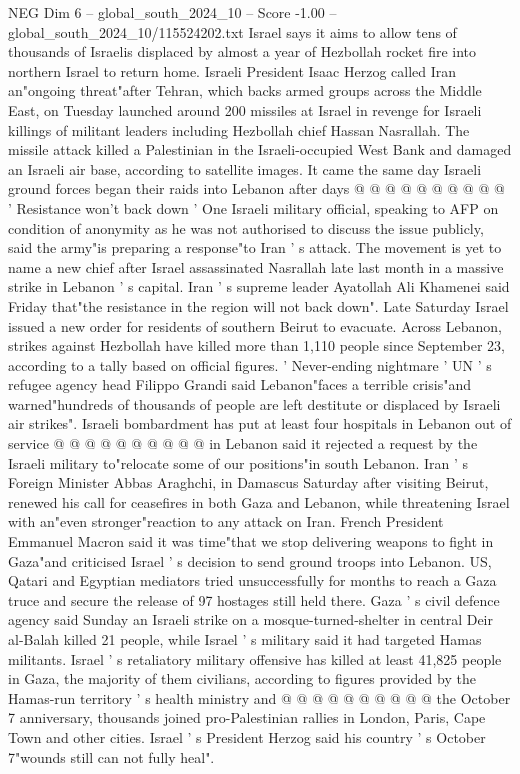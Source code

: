 \begin{textsample}{NEG Dim 6 – global\_south\_2024\_10 – Score -1.00 – global\_south\_2024\_10/115524202.txt}
Israel says it aims to allow tens of thousands of Israelis displaced by almost a year of Hezbollah rocket fire into northern Israel to return home.
Israeli President Isaac Herzog called Iran an"ongoing threat"after Tehran, which backs armed groups across the Middle East, on Tuesday launched around 200 missiles at Israel in revenge for Israeli killings of militant leaders including Hezbollah chief Hassan Nasrallah.
The missile attack killed a Palestinian in the Israeli-occupied West Bank and damaged an Israeli air base, according to satellite images.
It came the same day Israeli ground forces began their raids into Lebanon after days @ @ @ @ @ @ @ @ @ @ ' Resistance won't back down ' One Israeli military official, speaking to AFP on condition of anonymity as he was not authorised to discuss the issue publicly, said the army"is preparing a response"to Iran ' s attack.
The movement is yet to name a new chief after Israel assassinated Nasrallah late last month in a massive strike in Lebanon ' s capital.
Iran ' s supreme leader Ayatollah Ali Khamenei said Friday that"the resistance in the region will not back down".
Late Saturday Israel issued a new order for residents of southern Beirut to evacuate.
Across Lebanon, strikes against Hezbollah have killed more than 1,110 people since September 23, according to a tally based on official figures. ' Never-ending nightmare ' UN ' s refugee agency head Filippo Grandi said Lebanon"faces a terrible crisis"and warned"hundreds of thousands of people are left destitute or displaced by Israeli air strikes".
Israeli bombardment has put at least four hospitals in Lebanon out of service @ @ @ @ @ @ @ @ @ @ in Lebanon said it rejected a request by the Israeli military to"relocate some of our positions"in south Lebanon.
Iran ' s Foreign Minister Abbas Araghchi, in Damascus Saturday after visiting Beirut, renewed his call for ceasefires in both Gaza and Lebanon, while threatening Israel with an"even stronger"reaction to any attack on Iran.
French President Emmanuel Macron said it was time"that we stop delivering weapons to fight in Gaza"and criticised Israel ' s decision to send ground troops into Lebanon.
US, Qatari and Egyptian mediators tried unsuccessfully for months to reach a Gaza truce and secure the release of 97 hostages still held there.
Gaza ' s civil defence agency said Sunday an Israeli strike on a mosque-turned-shelter in central Deir al-Balah killed 21 people, while Israel ' s military said it had targeted Hamas militants.
Israel ' s retaliatory military offensive has killed at least 41,825 people in Gaza, the majority of them civilians, according to figures provided by the Hamas-run territory ' s health ministry and @ @ @ @ @ @ @ @ @ @ the October 7 anniversary, thousands joined pro-Palestinian rallies in London, Paris, Cape Town and other cities.
Israel ' s President Herzog said his country ' s October 7"wounds still can not fully heal".

\end{textsample}
